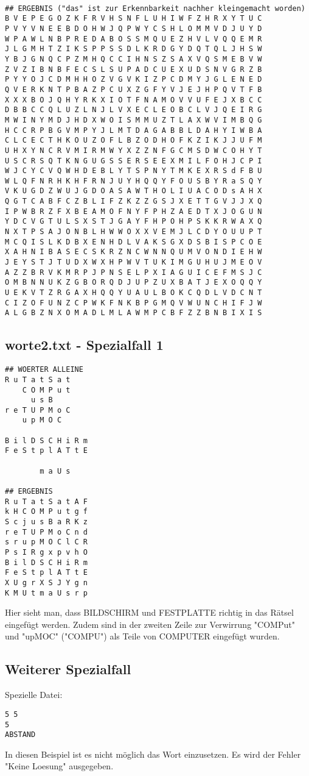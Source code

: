 \documentclass[a4paper,10pt,ngerman]{scrartcl}
\begin{document}
\begin{lstlisting}
                                                           
## ERGEBNIS ("das" ist zur Erkennbarkeit nachher kleingemacht worden)
B V E P E G O Z K F R V H S N F L U H I W F Z H R X Y T U C
P V Y V N E E B D O H W J Q P W Y C S H L O M M V D J U Y D
W P A W L N B P R E D A B O S S M Q U E Z H V L V Q Q E M R
J L G M H T Z I K S P P S S D L K R D G Y D Q T Q L J H S W
Y B J G N Q C P Z M H Q C C I H N S Z S A X V Q S M E B V W
Z V Z I B N B F E C S L S U P A D C U E X U D S N V G R Z B
P Y Y O J C D M H H O Z V G V K I Z P C D M Y J G L E N E D
Q V E R K N T P B A Z P C U X Z G F Y V J E J H P Q V T F B
X X X B O J Q H Y R K X I O T F N A M O V V U F E J X B C C
D B B C C Q L U Z L N J L V X E C L E O B C L V J Q E I R G
M W I N Y M D J H D X W O I S M M U Z T L A X W V I M B Q G
H C C R P B G V M P Y J L M T D A G A B B L D A H Y I W B A
C L C E C T H K O U Z O F L B Z O D H O F K Z I K J J U F M
U H X Y N C R V M I R M W Y X Z Z N F G C M S D W C O H Y T
U S C R S Q T K N G U G S S E R S E E X M I L F O H J C P I
W J C Y C V Q W H D E B L Y T S P N Y T M K E X R S d F B U
W L Q F N R H K H F R N J U Y H Q Q Y F O U S B Y R a S Q Y
V K U G D Z W U J G D O A S A W T H O L I U A C O D s A H X
Q G T C A B F C Z B L I F Z K Z Z G S J X E T T G V J J X Q
I P W B R Z F X B E A M O F N Y F P H Z A E D T X J O G U N
Y D C V G T U L S X S T J G A Y F H P O H P S K K R W A X Q
N X T P S A J O N B L H W W O X X V E M J L C D Y O U U P T
M C Q I S L K D B X E N H D L V A K S G X D S B I S P C O E
X A H N I B A S E C S K R Z N C W N N Q U M V O N D I E H W
J E Y S T J T U D X W X H P W V T U K I M G U H U J M E O V
A Z Z B R V K M R P J P N S E L P X I A G U I C E F M S J C
O M B N N U K Z G B O R Q D J U P Z U X B A T J E X O Q Q Y
U E K V T Z R G A X H Q Q Y U A U L B O K C Q D L V D C N T
C I Z O F U N Z C P W K F N K B P G M Q V W U N C H I F J W
A L G B Z N X O M A D L M L A W M P C B F Z Z B N B I X I S
\end{lstlisting}

\subsection*{worte2.txt - Spezialfall 1}
\begin{lstlisting}
## WOERTER ALLEINE
R u T a t S a t    
    C O M P u t    
      u s B        
r e T U P M o C    
    u p M O C      
                   
B i l D S C H i R m
F e S t p l A T t E
                   
        m a U s    

## ERGEBNIS
R u T a t S a t A F
k H C O M P u t g f
S c j u s B a R K z
r e T U P M o C n d
s r u p M O C l C R
P s I R g x p v h O
B i l D S C H i R m
F e S t p l A T t E
X U g r X S J Y g n
K M U t m a U s r p
\end{lstlisting}
Hier sieht man, dass BILDSCHIRM und FESTPLATTE richtig in das Rätsel eingefügt werden.
Zudem sind in der zweiten Zeile zur Verwirrung "COMPut" und "upMOC" ("COMPU") als Teile von COMPUTER
eingefügt wurden.\medskip
\subsection*{Weiterer Spezialfall}
Spezielle Datei:
\begin{lstlisting}
5 5
5
ABSTAND
\end{lstlisting}
In diesen Beispiel ist es nicht möglich das Wort einzusetzen. Es wird der Fehler "Keine Loesung" ausgegeben.
\end{document}
